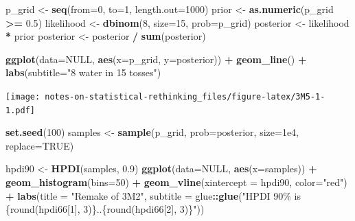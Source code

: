 \documentclass[
]{book}
\newenvironment{Shaded}{\begin{snugshade}}{\end{snugshade}}
\newcommand{\DataTypeTok}[1]{\textcolor[rgb]{0.13,0.29,0.53}{#1}}
\newcommand{\DecValTok}[1]{\textcolor[rgb]{0.00,0.00,0.81}{#1}}
\newcommand{\FloatTok}[1]{\textcolor[rgb]{0.00,0.00,0.81}{#1}}
\newcommand{\KeywordTok}[1]{\textcolor[rgb]{0.13,0.29,0.53}{\textbf{#1}}}
\newcommand{\NormalTok}[1]{#1}
\newcommand{\OperatorTok}[1]{\textcolor[rgb]{0.81,0.36,0.00}{\textbf{#1}}}
\newcommand{\OtherTok}[1]{\textcolor[rgb]{0.56,0.35,0.01}{#1}}
\newcommand{\StringTok}[1]{\textcolor[rgb]{0.31,0.60,0.02}{#1}}
\begin{document}
\begin{Shaded}
\begin{Highlighting}[]
\NormalTok{p\_grid \textless{}{-}}\StringTok{ }\KeywordTok{seq}\NormalTok{(}\DataTypeTok{from=}\DecValTok{0}\NormalTok{, }\DataTypeTok{to=}\DecValTok{1}\NormalTok{, }\DataTypeTok{length.out=}\DecValTok{1000}\NormalTok{)}
\NormalTok{prior \textless{}{-}}\StringTok{ }\KeywordTok{as.numeric}\NormalTok{(p\_grid }\OperatorTok{\textgreater{}=}\StringTok{ }\FloatTok{0.5}\NormalTok{)}
\NormalTok{likelihood \textless{}{-}}\StringTok{ }\KeywordTok{dbinom}\NormalTok{(}\DecValTok{8}\NormalTok{, }\DataTypeTok{size=}\DecValTok{15}\NormalTok{, }\DataTypeTok{prob=}\NormalTok{p\_grid)}
\NormalTok{posterior \textless{}{-}}\StringTok{ }\NormalTok{likelihood }\OperatorTok{*}\StringTok{ }\NormalTok{prior}
\NormalTok{posterior \textless{}{-}}\StringTok{ }\NormalTok{posterior }\OperatorTok{/}\StringTok{ }\KeywordTok{sum}\NormalTok{(posterior)}

\KeywordTok{ggplot}\NormalTok{(}\DataTypeTok{data=}\OtherTok{NULL}\NormalTok{, }\KeywordTok{aes}\NormalTok{(}\DataTypeTok{x=}\NormalTok{p\_grid, }\DataTypeTok{y=}\NormalTok{posterior)) }\OperatorTok{+}\StringTok{ }
\StringTok{  }\KeywordTok{geom\_line}\NormalTok{() }\OperatorTok{+}
\StringTok{  }\KeywordTok{labs}\NormalTok{(}\DataTypeTok{subtitle=}\StringTok{"8 water in 15 tosses"}\NormalTok{)}
\end{Highlighting}
\end{Shaded}

\texttt{[image: notes-on-statistical-rethinking\_files/figure-latex/3M5-1-1.pdf]}

\begin{Shaded}
\begin{Highlighting}[]
\KeywordTok{set.seed}\NormalTok{(}\DecValTok{100}\NormalTok{)}
\NormalTok{samples \textless{}{-}}\StringTok{ }\KeywordTok{sample}\NormalTok{(p\_grid, }\DataTypeTok{prob=}\NormalTok{posterior, }\DataTypeTok{size=}\FloatTok{1e4}\NormalTok{, }\DataTypeTok{replace=}\OtherTok{TRUE}\NormalTok{)}

\NormalTok{hpdi90 \textless{}{-}}\StringTok{ }\KeywordTok{HPDI}\NormalTok{(samples, }\FloatTok{0.9}\NormalTok{)}
\KeywordTok{ggplot}\NormalTok{(}\DataTypeTok{data=}\OtherTok{NULL}\NormalTok{, }\KeywordTok{aes}\NormalTok{(}\DataTypeTok{x=}\NormalTok{samples)) }\OperatorTok{+}\StringTok{ }
\StringTok{  }\KeywordTok{geom\_histogram}\NormalTok{(}\DataTypeTok{bins=}\DecValTok{50}\NormalTok{) }\OperatorTok{+}\StringTok{ }
\StringTok{  }\KeywordTok{geom\_vline}\NormalTok{(}\DataTypeTok{xintercept =}\NormalTok{ hpdi90, }\DataTypeTok{color=}\StringTok{"red"}\NormalTok{) }\OperatorTok{+}\StringTok{ }
\StringTok{  }\KeywordTok{labs}\NormalTok{(}\DataTypeTok{title =} \StringTok{"Remake of 3M2"}\NormalTok{,}
       \DataTypeTok{subtitle =}\NormalTok{ glue}\OperatorTok{::}\KeywordTok{glue}\NormalTok{(}\StringTok{"HPDI 90\% is \{round(hpdi66[1], 3)\}..\{round(hpdi66[2], 3)\}"}\NormalTok{))}
\end{Highlighting}
\end{Shaded}
\end{document}
